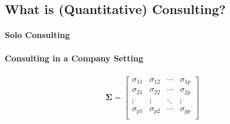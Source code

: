 \subsection{What is (Quantitative) Consulting?}
\paragraph{Solo Consulting}
\paragraph{Consulting in a Company Setting}

\begin{gather}
    \bm{\Sigma}=
    \begin{bmatrix}
    \sigma_{11}  &  \sigma_{12}  &  \cdots  &  \sigma_{1p} \\
    \sigma_{21}  &  \sigma_{22}  &  \cdots  &  \sigma_{2p} \\
    \vdots  &  \vdots  &   \ddots  &  \vdots \\
    \sigma_{p1}  &  \sigma_{p2}  &  \cdots  &  \sigma_{pp} \\
    \end{bmatrix}  
\end{gather}